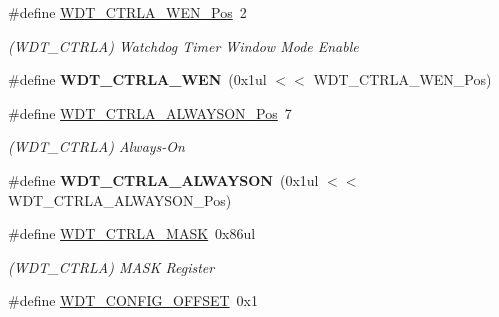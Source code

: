 \begin{DoxyCompactItemize}
\item 
\hypertarget{group___s_a_m_l21___w_d_t_gad4b6de3d877eecbb024d2a03ce192f77}{}\#define \hyperlink{group___s_a_m_l21___w_d_t_gad4b6de3d877eecbb024d2a03ce192f77}{W\+D\+T\+\_\+\+C\+T\+R\+L\+A\+\_\+\+W\+E\+N\+\_\+\+Pos}~2\label{group___s_a_m_l21___w_d_t_gad4b6de3d877eecbb024d2a03ce192f77}

\begin{DoxyCompactList}\small\item\em (W\+D\+T\+\_\+\+C\+T\+R\+L\+A) Watchdog Timer Window Mode Enable \end{DoxyCompactList}\item 
\hypertarget{group___s_a_m_l21___w_d_t_gaa6f3af9c13c4bd20db372a8663125ec1}{}\#define {\bfseries W\+D\+T\+\_\+\+C\+T\+R\+L\+A\+\_\+\+W\+E\+N}~(0x1ul $<$$<$ W\+D\+T\+\_\+\+C\+T\+R\+L\+A\+\_\+\+W\+E\+N\+\_\+\+Pos)\label{group___s_a_m_l21___w_d_t_gaa6f3af9c13c4bd20db372a8663125ec1}

\item 
\hypertarget{group___s_a_m_l21___w_d_t_ga6b4e9162576f200eeaab0bfeaccbf2e2}{}\#define \hyperlink{group___s_a_m_l21___w_d_t_ga6b4e9162576f200eeaab0bfeaccbf2e2}{W\+D\+T\+\_\+\+C\+T\+R\+L\+A\+\_\+\+A\+L\+W\+A\+Y\+S\+O\+N\+\_\+\+Pos}~7\label{group___s_a_m_l21___w_d_t_ga6b4e9162576f200eeaab0bfeaccbf2e2}

\begin{DoxyCompactList}\small\item\em (W\+D\+T\+\_\+\+C\+T\+R\+L\+A) Always-\/\+On \end{DoxyCompactList}\item 
\hypertarget{group___s_a_m_l21___w_d_t_ga4f09c5e13fe2ac803d47ab93e6698dfc}{}\#define {\bfseries W\+D\+T\+\_\+\+C\+T\+R\+L\+A\+\_\+\+A\+L\+W\+A\+Y\+S\+O\+N}~(0x1ul $<$$<$ W\+D\+T\+\_\+\+C\+T\+R\+L\+A\+\_\+\+A\+L\+W\+A\+Y\+S\+O\+N\+\_\+\+Pos)\label{group___s_a_m_l21___w_d_t_ga4f09c5e13fe2ac803d47ab93e6698dfc}

\item 
\hypertarget{group___s_a_m_l21___w_d_t_gac050a87c1be178866d39e2946773af8c}{}\#define \hyperlink{group___s_a_m_l21___w_d_t_gac050a87c1be178866d39e2946773af8c}{W\+D\+T\+\_\+\+C\+T\+R\+L\+A\+\_\+\+M\+A\+S\+K}~0x86ul\label{group___s_a_m_l21___w_d_t_gac050a87c1be178866d39e2946773af8c}

\begin{DoxyCompactList}\small\item\em (W\+D\+T\+\_\+\+C\+T\+R\+L\+A) M\+A\+S\+K Register \end{DoxyCompactList}\item 
\hypertarget{group___s_a_m_l21___w_d_t_ga0d3293445b10bdfdf733067d75f7b98c}{}\#define \hyperlink{group___s_a_m_l21___w_d_t_ga0d3293445b10bdfdf733067d75f7b98c}{W\+D\+T\+\_\+\+C\+O\+N\+F\+I\+G\+\_\+\+O\+F\+F\+S\+E\+T}~0x1\label{group___s_a_m_l21___w_d_t_ga0d3293445b10bdfdf733067d75f7b98c}


\end{DoxyCompactItemize}
